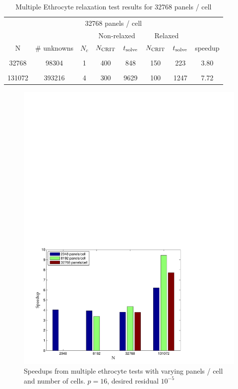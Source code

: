 \begin{table}[htdp]
\begin{center}
\begin{tabular}{c|c|c|cc|cc|c}

\multicolumn{8}{c}{32768 panels / cell} \\
& & & \multicolumn{2}{c}{Non-relaxed} & \multicolumn{2}{c}{Relaxed}\\
N & \# unknowns & $N_c$ & $N_{\text{CRIT}}$ & $t_{\text{solve}}$ & $N_{\text{CRIT}}$ & $t_{\text{solve}}$ & speedup \\ \hline
& & & & & & &  \\
32768 & 98304 & 1 & 400 & 848 & 150 & 223 & 3.80 \\
& & & & & & &  \\
131072 & 393216 & 4 & 300 & 9629\footnotemark[1] & 100 & 1247 & 7.72\footnotemark[1] \\	
\end{tabular}
\end{center}
\caption{Multiple Ethrocyte relaxation test results for 32768 panels / cell}
\label{tab:multiple_cell_relaxation_results_32768}
\end{table}

\begin{figure}[h]
\begin{center}
	\includegraphics[width=14cm]{img/StokesMultipleCellsSpeedup.pdf}
	\caption{Speedups from multiple ethrocyte tests with varying panels / cell and number of cells. $p = 16$, desired residual $10^{-5}$}
	\label{fig:multiple_cell_speedup}
\end{center}
\end{figure}

